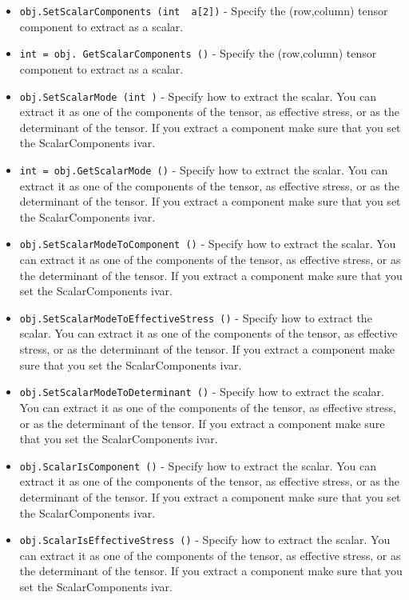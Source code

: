 \begin{itemize}
\item  \verb|obj.SetScalarComponents (int  a[2])| -  Specify the (row,column) tensor component to extract as a scalar.

\item  \verb|int = obj. GetScalarComponents ()| -  Specify the (row,column) tensor component to extract as a scalar.

\item  \verb|obj.SetScalarMode (int )| -  Specify how to extract the scalar. You can extract it as one of
 the components of the tensor, as effective stress, or as the
 determinant of the tensor. If you extract a component make sure
 that you set the ScalarComponents ivar.

\item  \verb|int = obj.GetScalarMode ()| -  Specify how to extract the scalar. You can extract it as one of
 the components of the tensor, as effective stress, or as the
 determinant of the tensor. If you extract a component make sure
 that you set the ScalarComponents ivar.

\item  \verb|obj.SetScalarModeToComponent ()| -  Specify how to extract the scalar. You can extract it as one of
 the components of the tensor, as effective stress, or as the
 determinant of the tensor. If you extract a component make sure
 that you set the ScalarComponents ivar.

\item  \verb|obj.SetScalarModeToEffectiveStress ()| -  Specify how to extract the scalar. You can extract it as one of
 the components of the tensor, as effective stress, or as the
 determinant of the tensor. If you extract a component make sure
 that you set the ScalarComponents ivar.

\item  \verb|obj.SetScalarModeToDeterminant ()| -  Specify how to extract the scalar. You can extract it as one of
 the components of the tensor, as effective stress, or as the
 determinant of the tensor. If you extract a component make sure
 that you set the ScalarComponents ivar.

\item  \verb|obj.ScalarIsComponent ()| -  Specify how to extract the scalar. You can extract it as one of
 the components of the tensor, as effective stress, or as the
 determinant of the tensor. If you extract a component make sure
 that you set the ScalarComponents ivar.

\item  \verb|obj.ScalarIsEffectiveStress ()| -  Specify how to extract the scalar. You can extract it as one of
 the components of the tensor, as effective stress, or as the
 determinant of the tensor. If you extract a component make sure
 that you set the ScalarComponents ivar.


\end{itemize}
